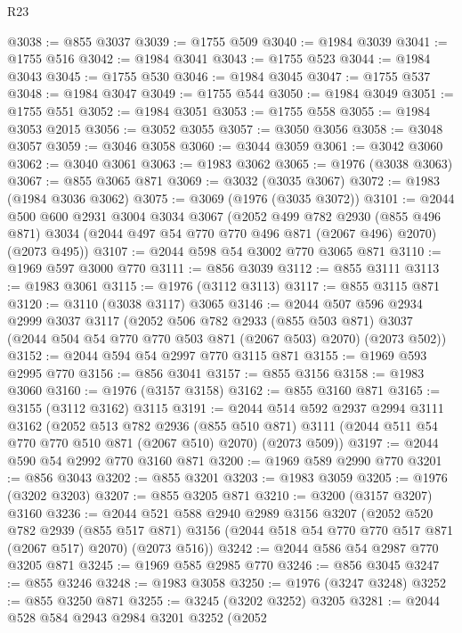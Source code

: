 \begin{lexlean}{R23}
\begin{coremodule}
@3038 := @855 @3037
@3039 := @1755 @509
@3040 := @1984 @3039
@3041 := @1755 @516
@3042 := @1984 @3041
@3043 := @1755 @523
@3044 := @1984 @3043
@3045 := @1755 @530
@3046 := @1984 @3045
@3047 := @1755 @537
@3048 := @1984 @3047
@3049 := @1755 @544
@3050 := @1984 @3049
@3051 := @1755 @551
@3052 := @1984 @3051
@3053 := @1755 @558
@3055 := @1984 @3053 @2015
@3056 := @3052 @3055
@3057 := @3050 @3056
@3058 := @3048 @3057
@3059 := @3046 @3058
@3060 := @3044 @3059
@3061 := @3042 @3060
@3062 := @3040 @3061
@3063 := @1983 @3062
@3065 := @1976 (@3038 @3063)
@3067 := @855 @3065 @871
@3069 := @3032 (@3035 @3067)
@3072 := @1983 (@1984 @3036 @3062)
@3075 := @3069 (@1976 (@3035 @3072))
@3101 := @2044
    @500
    @600
    @2931
    @3004
    @3034
    @3067
    (@2052
      @499
      @782
      @2930
      (@855 @496 @871)
      @3034
      (@2044 @497 @54 @770 @770 @496 @871 (@2067 @496) @2070)
      (@2073 @495))
@3107 := @2044 @598 @54 @3002 @770 @3065 @871
@3110 := @1969 @597 @3000 @770
@3111 := @856 @3039
@3112 := @855 @3111
@3113 := @1983 @3061
@3115 := @1976 (@3112 @3113)
@3117 := @855 @3115 @871
@3120 := @3110 (@3038 @3117) @3065
@3146 := @2044
    @507
    @596
    @2934
    @2999
    @3037
    @3117
    (@2052
      @506
      @782
      @2933
      (@855 @503 @871)
      @3037
      (@2044 @504 @54 @770 @770 @503 @871 (@2067 @503) @2070)
      (@2073 @502))
@3152 := @2044 @594 @54 @2997 @770 @3115 @871
@3155 := @1969 @593 @2995 @770
@3156 := @856 @3041
@3157 := @855 @3156
@3158 := @1983 @3060
@3160 := @1976 (@3157 @3158)
@3162 := @855 @3160 @871
@3165 := @3155 (@3112 @3162) @3115
@3191 := @2044
    @514
    @592
    @2937
    @2994
    @3111
    @3162
    (@2052
      @513
      @782
      @2936
      (@855 @510 @871)
      @3111
      (@2044 @511 @54 @770 @770 @510 @871 (@2067 @510) @2070)
      (@2073 @509))
@3197 := @2044 @590 @54 @2992 @770 @3160 @871
@3200 := @1969 @589 @2990 @770
@3201 := @856 @3043
@3202 := @855 @3201
@3203 := @1983 @3059
@3205 := @1976 (@3202 @3203)
@3207 := @855 @3205 @871
@3210 := @3200 (@3157 @3207) @3160
@3236 := @2044
    @521
    @588
    @2940
    @2989
    @3156
    @3207
    (@2052
      @520
      @782
      @2939
      (@855 @517 @871)
      @3156
      (@2044 @518 @54 @770 @770 @517 @871 (@2067 @517) @2070)
      (@2073 @516))
@3242 := @2044 @586 @54 @2987 @770 @3205 @871
@3245 := @1969 @585 @2985 @770
@3246 := @856 @3045
@3247 := @855 @3246
@3248 := @1983 @3058
@3250 := @1976 (@3247 @3248)
@3252 := @855 @3250 @871
@3255 := @3245 (@3202 @3252) @3205
@3281 := @2044
    @528
    @584
    @2943
    @2984
    @3201
    @3252
    (@2052

\end{coremodule}
\end{lexlean}
